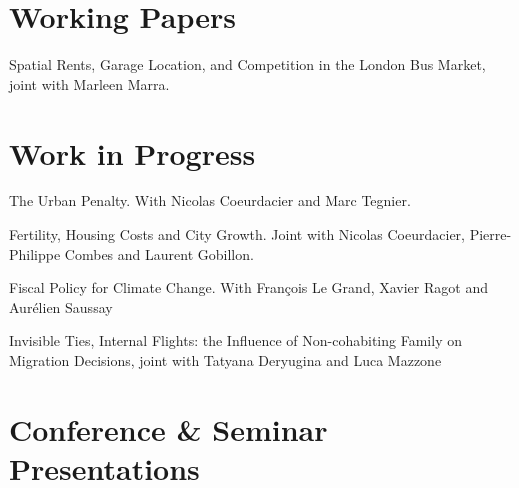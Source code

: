 \documentclass[letterpaper]{article}
\renewenvironment{itemize}{
  \begin{list}{}{
    \setlength{\leftmargin}{1.5em}
  }
}{
  \end{list}
}
\begin{document}
\section*{Working Papers}

\begin{itemize}

\item Spatial Rents, Garage Location, and Competition in the London Bus Market, joint with Marleen Marra.
\end{itemize}

\section*{Work in Progress}

\begin{itemize}
\item The Urban Penalty. With Nicolas Coeurdacier and Marc Tegnier.
\item Fertility, Housing Costs and City Growth. Joint with Nicolas Coeurdacier, Pierre-Philippe Combes and Laurent Gobillon.
\item Fiscal Policy for Climate Change. With François Le Grand, Xavier Ragot and Aurélien Saussay
\item Invisible Ties, Internal Flights: the Influence of Non-cohabiting Family on Migration Decisions, joint with Tatyana Deryugina and Luca Mazzone
\end{itemize}

\section*{Conference \& Seminar Presentations}
\end{document}
